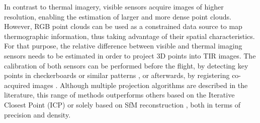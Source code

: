 In contrast to thermal imagery, visible sensors acquire images of higher resolution, enabling the estimation of larger and more dense point clouds. However, RGB point clouds can be used as a constrained data source to map thermographic information, thus taking advantage of their spatial characteristics. For that purpose, the relative difference between visible and thermal imaging sensors needs to be estimated in order to project 3D points into TIR images. The calibration of both sensors can be performed before the flight, by detecting key points in checkerboards or similar patterns \cite{adan_towards_2020, javadnejad_photogrammetric_2020}, or afterwards, by registering co-acquired images \cite{javadnejad_photogrammetric_2020}. Although multiple projection algorithms are described in the literature, this range of methods outperforms others based on the Iterative Closest Point (ICP) \cite{webster_three-dimensional_2018} or solely based on SfM reconstruction \cite{gonzalez_thermal_2019, grechi_3d_2021}, both in terms of precision and density. 






